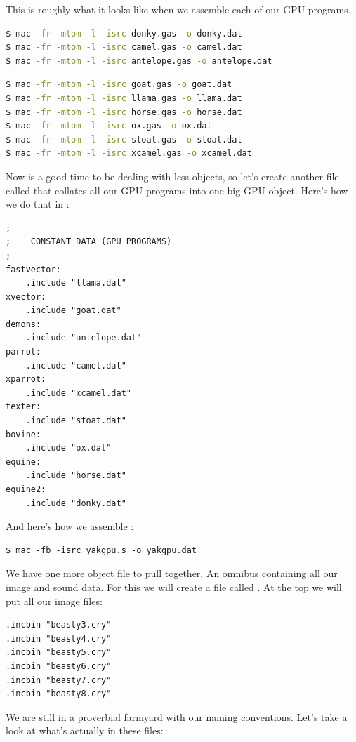 This is roughly what it looks like when we assemble each of our GPU programs.
\begin{lstlisting}[language=bash]
$ mac -fr -mtom -l -isrc donky.gas -o donky.dat
$ mac -fr -mtom -l -isrc camel.gas -o camel.dat
$ mac -fr -mtom -l -isrc antelope.gas -o antelope.dat
\end{lstlisting}
\begin{lstlisting}[language=bash]
$ mac -fr -mtom -l -isrc goat.gas -o goat.dat
$ mac -fr -mtom -l -isrc llama.gas -o llama.dat
$ mac -fr -mtom -l -isrc horse.gas -o horse.dat
$ mac -fr -mtom -l -isrc ox.gas -o ox.dat
$ mac -fr -mtom -l -isrc stoat.gas -o stoat.dat
$ mac -fr -mtom -l -isrc xcamel.gas -o xcamel.dat
\end{lstlisting}

Now is a good time to be dealing with less objects, so let's create another file called  that
collates all our GPU programs into one big GPU object. Here's how we do that in :

\begin{lstlisting}
;
;    CONSTANT DATA (GPU PROGRAMS)
;
fastvector:
    .include "llama.dat"
xvector:
    .include "goat.dat"
demons:
    .include "antelope.dat"
parrot:
    .include "camel.dat"
xparrot:
    .include "xcamel.dat"
texter:
    .include "stoat.dat"
bovine:
    .include "ox.dat"
equine:
    .include "horse.dat"
equine2:
    .include "donky.dat"
\end{lstlisting}

And here's how we assemble :
\begin{lstlisting}
$ mac -fb -isrc yakgpu.s -o yakgpu.dat
\end{lstlisting}

We have one more object file to pull together. An omnibus containing all our image and sound data. For this
we will create a file called . At the top we will put all our image files:

\begin{lstlisting}
.incbin "beasty3.cry"
.incbin "beasty4.cry"
.incbin "beasty5.cry"
.incbin "beasty6.cry"
.incbin "beasty7.cry"
.incbin "beasty8.cry"
\end{lstlisting}

We are still in a proverbial farmyard with our naming conventions. Let's take a look at what's actually in these files:

